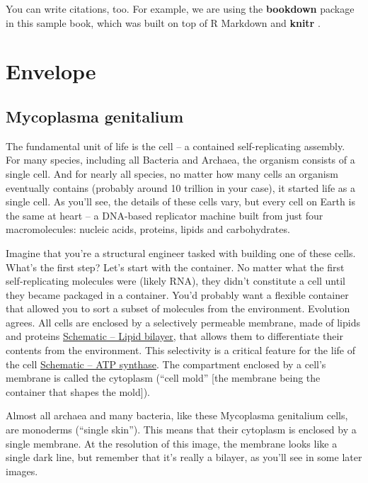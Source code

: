 \documentclass[]{book}
\begin{document}
You can write citations, too. For example, we are using the
\textbf{bookdown} package \citep{R-bookdown} in this sample book, which
was built on top of R Markdown and \textbf{knitr} \citep{xie2015}.

\chapter{Envelope}\label{envelope}

\section{Mycoplasma genitalium}\label{mycoplasma-genitalium}

The fundamental unit of life is the cell -- a contained self-replicating
assembly. For many species, including all Bacteria and Archaea, the
organism consists of a single cell. And for nearly all species, no
matter how many cells an organism eventually contains (probably around
10 trillion in your case), it started life as a single cell. As you'll
see, the details of these cells vary, but every cell on Earth is the
same at heart -- a DNA-based replicator machine built from just four
macromolecules: nucleic acids, proteins, lipids and carbohydrates.

Imagine that you're a structural engineer tasked with building one of
these cells. What's the first step? Let's start with the container. No
matter what the first self-replicating molecules were (likely RNA), they
didn't constitute a cell until they became packaged in a container.
You'd probably want a flexible container that allowed you to sort a
subset of molecules from the environment. Evolution agrees. All cells
are enclosed by a selectively permeable membrane, made of lipids and
proteins \protect\hyperlink{fig:2-1-1}{Schematic -- Lipid bilayer}, that
allows them to differentiate their contents from the environment. This
selectivity is a critical feature for the life of the cell
\protect\hyperlink{fig:2-1-2}{Schematic -- ATP synthase}. The
compartment enclosed by a cell's membrane is called the cytoplasm
(``cell mold'' {[}the membrane being the container that shapes the
mold{]}).

Almost all archaea and many bacteria, like these Mycoplasma genitalium
cells, are monoderms (``single skin''). This means that their cytoplasm
is enclosed by a single membrane. At the resolution of this image, the
membrane looks like a single dark line, but remember that it's really a
bilayer, as you'll see in some later images.
\end{document}
